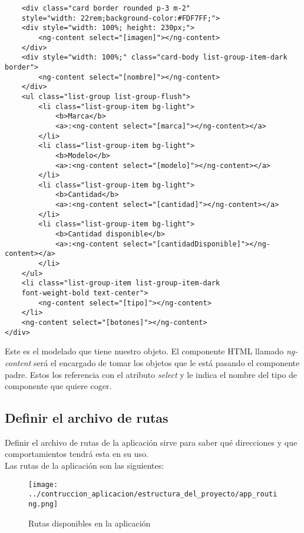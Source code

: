 \begin{verbatim}
    <div class="card border rounded p-3 m-2" 
    style="width: 22rem;background-color:#FDF7FF;">
    <div style="width: 100%; height: 230px;">
        <ng-content select="[imagen]"></ng-content>
    </div>
    <div style="width: 100%;" class="card-body list-group-item-dark border">
        <ng-content select="[nombre]"></ng-content>
    </div>
    <ul class="list-group list-group-flush">
        <li class="list-group-item bg-light">
            <b>Marca</b>
            <a>:<ng-content select="[marca]"></ng-content></a>
        </li>
        <li class="list-group-item bg-light">
            <b>Modelo</b>
            <a>:<ng-content select="[modelo]"></ng-content></a>
        </li>
        <li class="list-group-item bg-light">
            <b>Cantidad</b>
            <a>:<ng-content select="[cantidad]"></ng-content></a>
        </li>
        <li class="list-group-item bg-light">
            <b>Cantidad disponible</b>
            <a>:<ng-content select="[cantidadDisponible]"></ng-content></a>
        </li>
    </ul>
    <li class="list-group-item list-group-item-dark 
    font-weight-bold text-center">
        <ng-content select="[tipo]"></ng-content>
    </li>
    <ng-content select="[botones]"></ng-content>
</div>
\end{verbatim}
Este es el modelado que tiene nuestro objeto. El componente HTML llamado \textit{ng-content} será el encargado de tomar los objetos que le está pasando el componente padre. Estos los referencia con el atributo \textit{select} y le indica el nombre del tipo de componente que quiere coger.

\subsection{Definir el archivo de rutas}
Definir el archivo de rutas de la aplicación sirve para saber qué direcciones y que comportamientos tendrá esta en su uso.
\\Las rutas de la aplicación son las siguientes:

\begin{figure}[h]
    \centering
    \texttt{[image: ../contruccion\_aplicacion/estructura\_del\_proyecto/app\_routing.png]}
    \caption{Rutas disponibles en la aplicación}
\end{figure}

